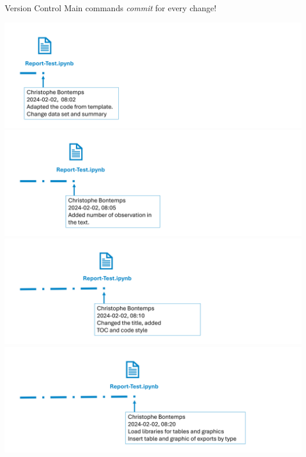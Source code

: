 \documentclass[xcolor=x11names,compress]{beamer}
\renewcommand{\(}{\begin{columns}}
\renewcommand{\)}{\end{columns}}
\newcommand{\<}[1]{\begin{column}{#1}}
\renewcommand{\>}{\end{column}}
\begin{document}
\begin{frame}{Version Control Main commands}
\emph{commit} for every change!
\begin{center}
\begin{itemize}
    {\includegraphics[width = 1.0\textwidth]{FileLife1.png} \\ }
    {\includegraphics[width = 1.0\textwidth]{FileLife2.png} \\ }
    {\includegraphics[width = 1.0\textwidth]{FileLife3.png} \\ }
    {\includegraphics[width = 1.0\textwidth]{FileLife4.png} \\ }

\end{itemize}
\end{center}
\end{frame}
\end{document}
